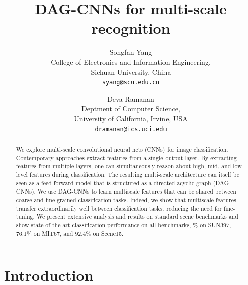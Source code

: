 \documentclass[10pt,twocolumn,letterpaper]{article}
\begin{document}
\title{DAG-CNNs for multi-scale recognition}

\author{Songfan Yang\\
College of Electronics and Information Engineering,\\
Sichuan University, China\\
{\tt\small syang@scu.edu.cn}
\and
Deva Ramanan\\
Deptment of Computer Science,\\
University of California, Irvine, USA\\
{\tt\small dramanan@ics.uci.edu}
}

\maketitle

\begin{abstract}
We explore multi-scale convolutional neural nets (CNNs) for image classification. Contemporary approaches extract features from a single output layer. By extracting features from multiple layers, one can simultaneously reason about high, mid, and low-level features during classification. The resulting multi-scale architecture can itself be seen as a feed-forward model that is structured as a directed acyclic graph (DAG-CNNs). %
We use DAG-CNNs to learn multiscale features that can be shared between coarse and fine-grained classification tasks. Indeed, we show that multiscale features transfer extraordinarily well between classification tasks, reducing the need for fine-tuning. We present extensive analysis and results on standard scene benchmarks and show state-of-the-art classification performance on all benchmarks, \% on SUN397, 76.1\% on MIT67, and 92.4\% on Scene15.

\end{abstract}

\section{Introduction}
\end{document}
